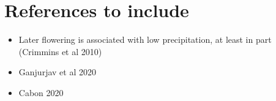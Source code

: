 \documentclass{article}
\begin{document}
% 
% 
% 
% 
% 
% 
% 
% 
% 




\section*{References to include}
\begin{itemize}
\item Later flowering is  associated with low precipitation, at least in part (Crimmins et al 2010)
\item Ganjurjav et al 2020
\item Cabon 2020
\end{itemize}
\end{document}
